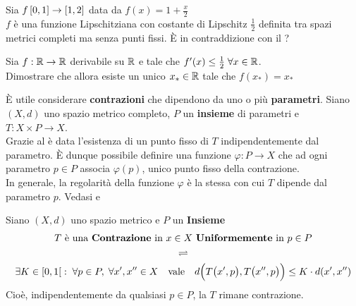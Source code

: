 \begin{exercise}
	Sia $f \left[0,1\right] \to \left[1,2\right]$ data da $f(x) = 1 + \frac{x}{2}$\\
	$f$ è una funzione Lipschitziana con costante di Lipschitz $\frac{1}{2}$ definita tra spazi metrici completi ma senza punti fissi. È in contraddizione con il ?
\end{exercise}
\begin{exercise}
	Sia $f:\mathbb{R} \to \mathbb{R}$ derivabile su $\mathbb{R}$ e tale che $f'(x) \leq \frac{1}{2} \; \forall x \in \mathbb{R}$.\\
	Dimostrare che allora esiste un unico $x_* \in \mathbb{R}$ tale che $f(x_*) = x_*$
\end{exercise}

\begin{observation}
	\label{obs:contr_con_para}
	È utile considerare \textbf{contrazioni} che dipendono da uno o più \textbf{parametri}. Siano $(X,d)$ uno spazio metrico completo, $P$ un \textbf{insieme} di parametri e $T:X \times P \to X$.\\
	Grazie al  è data l'esistenza di un punto fisso di $T$ indipendentemente dal parametro. È dunque possibile definire una funzione $\varphi: P \to X$ che ad ogni parametro $p \in P$ associa $\varphi(p)$, unico punto fisso della contrazione.\\
	In generale, la regolarità della funzione $\varphi$ è la stessa con cui $T$ dipende dal parametro $p$. Vedasi  e 
\end{observation}

\begin{definition}
	\label{def:contrazione_parametro}
	Siano $(X,d)$ uno spazio metrico e $P$ un \textbf{Insieme}
	\begin{equation}
		\label{eq:contrazione_parametro}
		\begin{gathered}
			T \text{ è una \textbf{Contrazione} in } x \in X \text{ \textbf{Uniformemente} in } p \in P\\
			\rightleftharpoons\\
			\exists K \in \left[0,1\right[: \; \forall p \in P,\; \forall x', x'' \in X \quad \text{vale} \quad d \Bigl( T\bigl( x', p \bigr), T\bigl( x'', p \bigr) \Bigr) \leq K \cdot d(x', x'')
		\end{gathered}
	\end{equation}
	Cioè, indipendentemente da qualsiasi $p \in P$, la $T$ rimane contrazione.
\end{definition}

